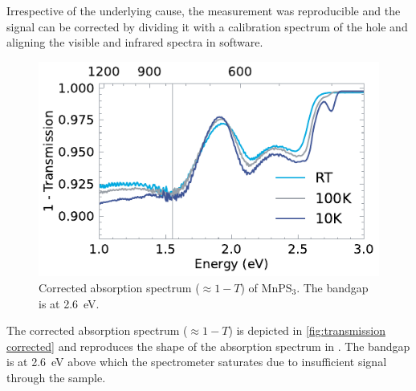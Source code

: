\documentclass[
	twoside,
	parskip=half,
	a4paper,
]{scrbook}
\begin{document}
Irrespective of the underlying cause, the measurement was reproducible and the signal can be corrected by dividing it with a calibration spectrum of the hole and aligning the visible and infrared spectra in software.

\begin{figure}
	\centering
	\includegraphics{../figures/2024-03-15 MnPS3 transmission processed.pdf }
	\caption{Corrected absorption spectrum ($\approx 1- T$) of MnPS$_3$. The bandgap is at \SI{2.6}{eV}.}
	\label{fig:transmission corrected}
\end{figure}
The corrected absorption spectrum ($\approx 1 - T$) is depicted in \autoref{fig:transmission corrected} and reproduces the shape of the absorption spectrum in \cite{MnPS3_transmission}.
The bandgap is at \SI{2.6}{eV} above which the spectrometer saturates due to insufficient signal through the sample.
\end{document}
